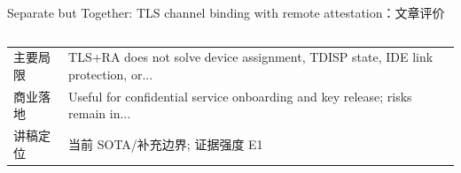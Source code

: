 \begin{frame}[t,shrink=6]{Separate but Together: TLS channel binding with remote attestation：文章评价}
\begin{columns}[T,totalwidth=\textwidth]
\begin{column}{0.49\textwidth}
{\begin{minipage}[t]{0.97\linewidth}
\begin{minipage}{0.92\linewidth}
{\begin{tabularx}{\linewidth}{@{}YY@{}}
主要局限 & TLS+RA does not solve device assignment, TDISP state, IDE link protection, or... \\
商业落地 & Useful for confidential service onboarding and key release; risks remain in... \\
讲稿定位 & 当前 SOTA/补充边界; 证据强度 E1 \\
\bottomrule
\end{tabularx}
}
    \end{minipage}
    \vspace{1mm}
  \end{minipage}}
  \end{column}
\end{columns}
\end{frame}


